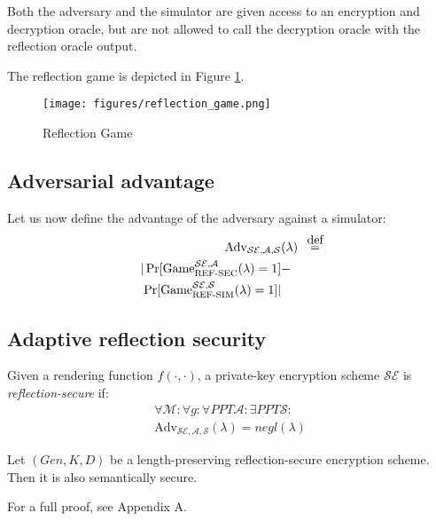 Both the adversary and the simulator are given access to an encryption and decryption oracle, but
are not allowed to call the decryption oracle with the reflection oracle output.

The reflection game is depicted in Figure \ref{fig:refgame}.

    \begin{figure}[thpb]
        \centering
            \texttt{[image: figures/reflection\_game.png]}
        \caption{Reflection Game}
        \label{fig:refgame}
    \end{figure}

\subsection{Adversarial advantage}\label{subsec:refsecadv}

Let us now define the advantage of the adversary against a simulator:
\begin{align*}
    \text{Adv}_{\mathcal{SE}, \mathcal{A}, \mathcal{S}}&(\lambda) &\defeq\\
    |\Pr[\text{Game}_{\text{REF-SEC}}^{\mathcal{SE},\mathcal{A}}(\lambda) = 1] &-\\
    \Pr[\text{Game}_{\text{REF-SIM}}^{\mathcal{SE},\mathcal{S}}(\lambda) = 1]| &
\end{align*}

\subsection{Adaptive reflection security}\label{subsec:adaptiverefsec}

Given a rendering function $f(\cdot, \cdot)$, a private-key encryption
scheme $\mathcal{SE}$ is \textit{reflection-secure} if:
\begin{align*}
    \forall \mathcal{M}:
    \forall g:
    \forall PPT \mathcal{A}:
    \exists PPT \mathcal{S}:\\
    \text{Adv}_{\mathcal{SE}, \mathcal{A}, \mathcal{S}}(\lambda) = negl(\lambda)
\end{align*}

\begin{lemma}
    Let $(Gen, K, D)$ be a length-preserving reflection-secure encryption
    scheme. Then it is also semantically secure.
\end{lemma}

For a full proof, see Appendix A.
